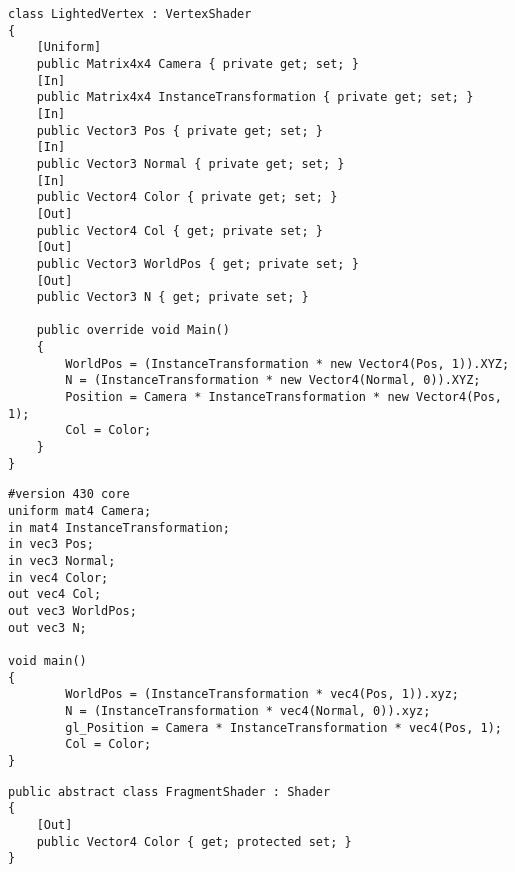 \begin{lstlisting}[caption = {Vertex shader written in C\#}, label = {lst:sharpVertex}]
class LightedVertex : VertexShader
{
    [Uniform]
    public Matrix4x4 Camera { private get; set; }
    [In]
    public Matrix4x4 InstanceTransformation { private get; set; }
    [In]
    public Vector3 Pos { private get; set; }
    [In]
    public Vector3 Normal { private get; set; }
    [In]
    public Vector4 Color { private get; set; }
    [Out]
    public Vector4 Col { get; private set; }
    [Out]
    public Vector3 WorldPos { get; private set; }
    [Out]
    public Vector3 N { get; private set; }
    
    public override void Main()
    {
        WorldPos = (InstanceTransformation * new Vector4(Pos, 1)).XYZ;
        N = (InstanceTransformation * new Vector4(Normal, 0)).XYZ;
        Position = Camera * InstanceTransformation * new Vector4(Pos, 1);
        Col = Color;
    }
}
\end{lstlisting}

\begin{lstlisting}[caption = {Vertex shader translated in GLSL}, label = {lst:outputVertex}]
#version 430 core
uniform mat4 Camera;
in mat4 InstanceTransformation;
in vec3 Pos;
in vec3 Normal;
in vec4 Color;
out vec4 Col;
out vec3 WorldPos;
out vec3 N;

void main()
{
        WorldPos = (InstanceTransformation * vec4(Pos, 1)).xyz;
        N = (InstanceTransformation * vec4(Normal, 0)).xyz;
        gl_Position = Camera * InstanceTransformation * vec4(Pos, 1);
        Col = Color;
}
\end{lstlisting}

\begin{lstlisting}[caption = {Base class of a fragment shader in C\#}, label = {lst:fragmentBase}]
public abstract class FragmentShader : Shader
{
    [Out]
    public Vector4 Color { get; protected set; }
}
\end{lstlisting}

